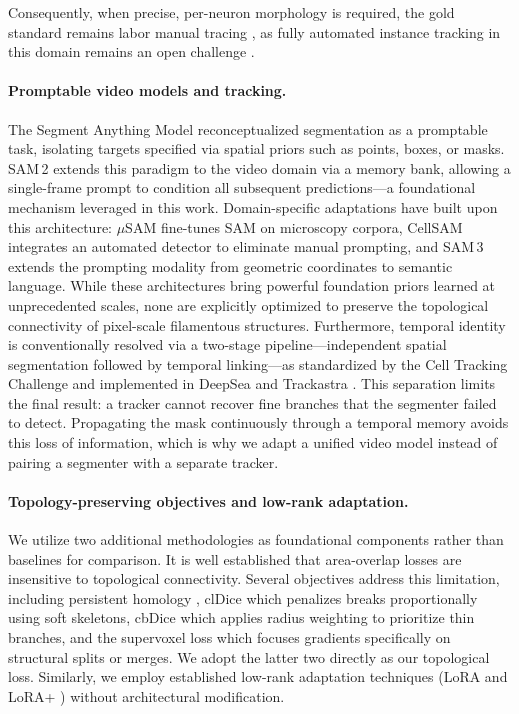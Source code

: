 \documentclass[11pt,a4paper]{article}
\begin{document}
Consequently, when precise, per-neuron morphology is required, the gold
standard remains labor manual tracing
\cite{meijering2004neuronj,longair2011snt}, as fully automated instance
tracking in this domain remains an open challenge
\cite{liu2022neurontracing}.

\paragraph{Promptable video models and tracking.} The Segment Anything Model
\cite{kirillov2023sam} reconceptualized segmentation as a promptable task,
isolating targets specified via spatial priors such as points, boxes, or
masks. SAM\,2 \cite{ravi2025sam2} extends this paradigm to the video domain
via a memory bank, allowing a single-frame prompt to condition all
subsequent predictions---a foundational mechanism leveraged in this work.
Domain-specific adaptations have built upon this architecture: $\mu$SAM
\cite{archit2025microsam} fine-tunes SAM on microscopy corpora, CellSAM
\cite{marks2025cellsam} integrates an automated detector to eliminate
manual prompting, and SAM\,3 \cite{carion2025sam3} extends the prompting
modality from geometric coordinates to semantic language. While these
architectures bring powerful
foundation priors learned at unprecedented scales, none are explicitly
optimized to preserve the topological connectivity of pixel-scale
filamentous structures. Furthermore, temporal identity is conventionally
resolved via a two-stage pipeline---independent spatial segmentation
followed by temporal linking---as standardized by the Cell Tracking
Challenge \cite{maska2023ctc} and implemented in DeepSea
\cite{zargari2023deepsea} and Trackastra \cite{gallusser2024trackastra}.
This separation limits the final result: a tracker cannot recover fine
branches that the segmenter failed to detect. Propagating the mask
continuously through a temporal memory avoids this loss of information,
which is why we adapt a unified video model instead of pairing a segmenter
with a separate tracker.

\paragraph{Topology-preserving objectives and low-rank adaptation.} We
utilize two additional methodologies as foundational components rather than
baselines for comparison. It is well established that area-overlap losses
are insensitive to topological connectivity. Several objectives address this
limitation, including persistent homology \cite{hu2019topology}, clDice
\cite{shit2021cldice} which penalizes breaks proportionally using soft
skeletons, cbDice \cite{shi2024cbdice} which applies radius weighting to
prioritize thin branches, and the supervoxel loss \cite{grim2025supervoxel}
which focuses gradients specifically on structural splits or merges. We
adopt the latter two directly as our topological
loss. Similarly, we employ established low-rank adaptation techniques (LoRA
\cite{hu2022lora} and LoRA+ \cite{hayou2024loraplus}) without architectural
modification.
\end{document}
